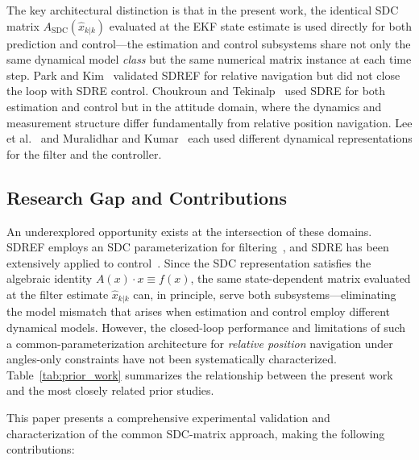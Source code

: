\documentclass[preprint,3p,times]{elsarticle}
\begin{document}
The key architectural distinction is that in the present work, the identical SDC matrix $A_{\text{SDC}}(\hat{x}_{k|k})$ evaluated at the EKF state estimate is used directly for both prediction and control---the estimation and control subsystems share not only the same dynamical model \emph{class} but the same numerical matrix instance at each time step. Park and Kim~\cite{Park2016} validated SDREF for relative navigation but did not close the loop with SDRE control. Choukroun and Tekinalp~\cite{Choukroun2013} used SDRE for both estimation and control but in the attitude domain, where the dynamics and measurement structure differ fundamentally from relative position navigation. Lee et al.~\cite{Lee2012} and Muralidhar and Kumar~\cite{Muralidhar2021} each used different dynamical representations for the filter and the controller.

\subsection{Research Gap and Contributions}

An underexplored opportunity exists at the intersection of these domains. SDREF employs an SDC parameterization for filtering~\cite{Park2016}, and SDRE has been extensively applied to control~\cite{Cimen2012}. Since the SDC representation satisfies the algebraic identity $A(x)\cdot x \equiv f(x)$, the same state-dependent matrix evaluated at the filter estimate $\hat{x}_{k|k}$ can, in principle, serve both subsystems---eliminating the model mismatch that arises when estimation and control employ different dynamical models. However, the closed-loop performance and limitations of such a common-parameterization architecture for \emph{relative position} navigation under angles-only constraints have not been systematically characterized. Table~\ref{tab:prior_work} summarizes the relationship between the present work and the most closely related prior studies.

This paper presents a comprehensive experimental validation and characterization of the common SDC-matrix approach, making the following contributions:
\end{document}

